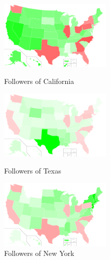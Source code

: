 \begin{figure}[t]
\begin{minipage}[b]{0.32\linewidth}
\centering
\includegraphics[width=53mm]{./images/ca.pdf}
\caption{Followers of California}
\label{fig:state-ca}
\end{minipage}
\hspace{2mm}
\begin{minipage}[b]{0.32\linewidth}
\centering
\includegraphics[width=53mm]{./images/tx.pdf}
\caption{Followers of Texas}
\label{fig:state-tx}
\end{minipage}
\hspace{2mm}
\begin{minipage}[b]{0.32\linewidth}
\centering
\includegraphics[width=53mm]{./images/ny.pdf}
\caption{Followers of New York}
\label{fig:state-ny}
\end{minipage}
\end{figure}

